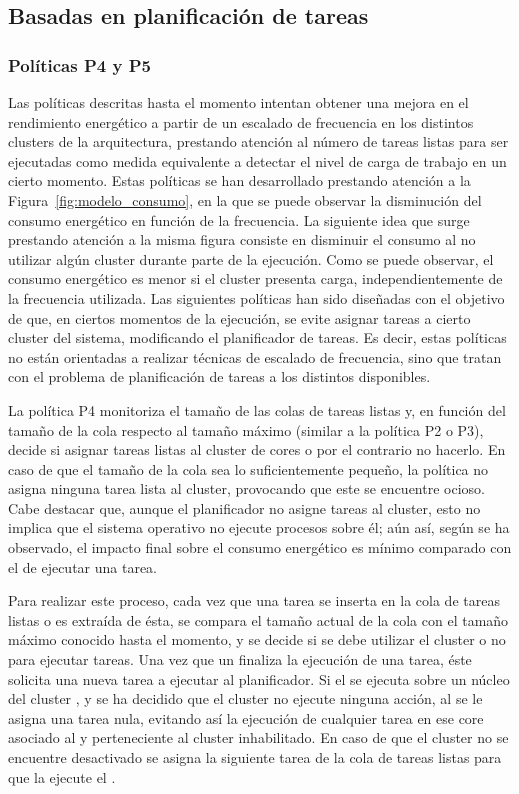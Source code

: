 \subsection[Basadas en planificación de tareas (P4, P5 y P6)]{Basadas en planificación de tareas}

\subsubsection{Políticas P4 y P5}

Las políticas descritas hasta el momento intentan obtener una mejora en el
rendimiento energético a partir de un escalado de frecuencia en los
distintos clusters de la arquitectura, prestando atención al número de
tareas listas para ser ejecutadas como medida equivalente a detectar el
nivel de carga de trabajo en un cierto momento. Estas políticas se han
desarrollado prestando atención a la Figura~\ref{fig:modelo_consumo}, en la
que se puede observar la disminución del consumo energético en función de
la frecuencia. La siguiente idea que surge prestando atención a la misma
figura consiste en disminuir el consumo al no utilizar algún cluster
durante parte de la ejecución. Como se puede observar, el consumo energético
es menor si el cluster presenta carga, independientemente de la frecuencia
utilizada. Las siguientes políticas han sido diseñadas con el objetivo de
que, en ciertos momentos de la ejecución, se evite asignar tareas a cierto
cluster del sistema, modificando el planificador de tareas.
Es decir, estas políticas no están orientadas a realizar técnicas de escalado
de frecuencia, sino que tratan con el
problema de planificación de tareas a los distintos \wts disponibles.

La política P4 monitoriza el tamaño de las colas de tareas listas y, en
función del tamaño de la cola respecto al tamaño máximo (similar a la
política P2 o P3), decide si asignar tareas listas al cluster de cores
\LITTLE o por el contrario no hacerlo. En caso de que el tamaño de la cola 
sea lo suficientemente pequeño, la política no asigna ninguna tarea lista al cluster, provocando
que este se encuentre ocioso. Cabe destacar que, aunque el planificador
no asigne tareas al cluster, esto no implica que el sistema operativo no
ejecute procesos sobre él; aún así, según se ha observado, el impacto final 
sobre el consumo energético es mínimo comparado con el de ejecutar una tarea.

Para realizar este proceso, cada vez que una tarea se inserta en la cola de
tareas listas o es extraída de ésta, se compara el tamaño actual de la cola
con el tamaño máximo conocido hasta el momento, y se decide si se debe
utilizar el cluster o no para ejecutar tareas. Una vez que un \wt
finaliza la ejecución de una tarea, éste solicita una nueva tarea a
ejecutar al planificador. Si el \wt se ejecuta sobre un núcleo del cluster
\LITTLE, y se ha decidido que el cluster no ejecute ninguna acción, al \wt
se le asigna una tarea nula, evitando así la ejecución de cualquier tarea
en ese core asociado al \wt y perteneciente al cluster inhabilitado. En
caso de que el cluster no se encuentre desactivado se asigna la siguiente
tarea de la cola de tareas listas para que la ejecute el \wt.

